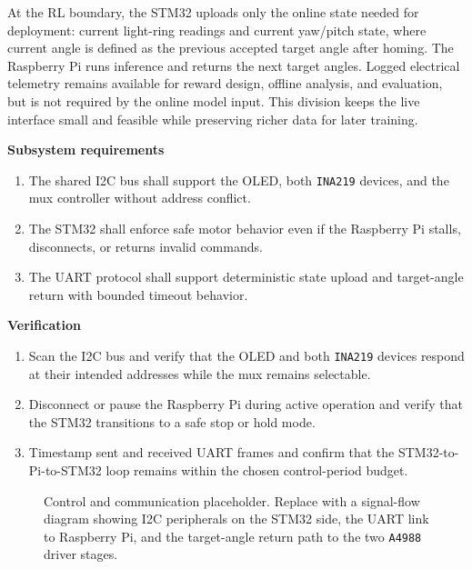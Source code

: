 \documentclass[11pt]{article}
\begin{document}
At the RL boundary, the STM32 uploads only the online state needed for deployment: current light-ring readings and current yaw/pitch state, where current angle is defined as the previous accepted target angle after homing. The Raspberry Pi runs inference and returns the next target angles. Logged electrical telemetry remains available for reward design, offline analysis, and evaluation, but is not required by the online model input. This division keeps the live interface small and feasible while preserving richer data for later training.

\textbf{Subsystem requirements}
\begin{enumerate}[label=\arabic*.]
\item The shared I2C bus shall support the OLED, both \texttt{INA219} devices, and the mux controller without address conflict.
\item The STM32 shall enforce safe motor behavior even if the Raspberry Pi stalls, disconnects, or returns invalid commands.
\item The UART protocol shall support deterministic state upload and target-angle return with bounded timeout behavior.
\end{enumerate}

\textbf{Verification}
\begin{enumerate}[label=\arabic*.]
\item Scan the I2C bus and verify that the OLED and both \texttt{INA219} devices respond at their intended addresses while the mux remains selectable.
\item Disconnect or pause the Raspberry Pi during active operation and verify that the STM32 transitions to a safe stop or hold mode.
\item Timestamp sent and received UART frames and confirm that the STM32-to-Pi-to-STM32 loop remains within the chosen control-period budget.
\end{enumerate}

\begin{figure}[H]
\centering
\fbox{\rule{0pt}{2.0in}\rule{0.86\linewidth}{0pt}}
\caption{Control and communication placeholder. Replace with a signal-flow diagram showing I2C peripherals on the STM32 side, the UART link to Raspberry Pi, and the target-angle return path to the two \texttt{A4988} driver stages.}
\label{fig:control}
\end{figure}
\end{document}
